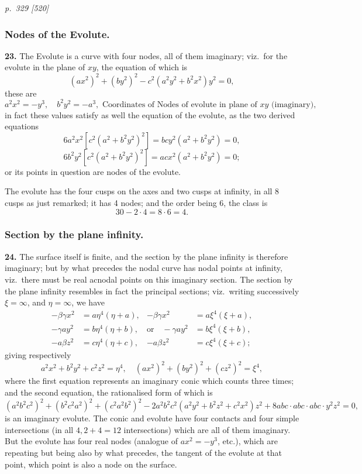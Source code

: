 \documentclass[11pt,a4paper]{article}
\theoremstyle{plain}
\theoremstyle{definition}
\begin{document}
\clearpage

\bigskip
\textit{p.~329 [520]}
\smallskip

\subsubsection*{Nodes of the Evolute.}

\textbf{23.} The Evolute is a curve with four nodes, all of them imaginary; viz.\ for the evolute in the plane of $xy$, the equation of which is
\[
(a x^2)^2 + (b y^2)^2 - c^2(a^2 y^2 + b^2 x^2) y^2 = 0,
\]
these are
\[
a^2 x^2 = -y^3,\quad b^2 y^2 = -a^3,\text{ Coordinates of Nodes of evolute in plane of $xy$ (imaginary)},
\]
in fact these values satisfy as well the equation of the evolute, as the two derived equations
\[
6a^2 x^2 [c^2(a^2 + b^2 y^2)^2] = b c y^2(a^2 + b^2 y^2) = 0,
\]
\[
6b^2 y^2 [c^2(a^2 + b^2 y^2)^2] = a c x^2(a^2 + b^2 y^2) = 0;
\]
or its points in question are nodes of the evolute.

The evolute has the four cusps on the axes and two cusps at infinity, in all 8 cusps as just remarked; it has 4 nodes; and the order being 6, the class is
\[
30 - 2 \cdot 4 = 8 \cdot 6 = 4.
\]

\subsubsection*{Section by the plane infinity.}

\textbf{24.} The surface itself is finite, and the section by the plane infinity is therefore imaginary; but by what precedes the nodal curve has nodal points at infinity, viz.\ there must be real acnodal points on this imaginary section. The section by the plane infinity resembles in fact the principal sections; viz.\ writing successively $\xi = \infty$, and $\eta = \infty$, we have
\begin{align*}
-\beta\gamma x^2 &= a\eta^4(\eta + a), & -\beta\gamma x^2 &= a\xi^4(\xi + a),\\
-\gamma a y^2 &= b\eta^4(\eta + b), & \text{or}\quad -\gamma a y^2 &= b\xi^4(\xi + b),\\
-a\beta z^2 &= c\eta^4(\eta + c), & -a\beta z^2 &= c\xi^4(\xi + c);
\end{align*}
giving respectively
\[
a^2 x^2 + b^2 y^2 + c^2 z^2 = \eta^4,\quad (a x^2)^2 + (b y^2)^2 + (c z^2)^2 = \xi^4,
\]
where the first equation represents an imaginary conic which counts three times; and the second equation, the rationalised form of which is
\[
(a^2 b^2 c^2)^2 + (b^2 c^2 a^2)^2 + (c^2 a^2 b^2)^2 - 2a^2 b^2 c^2 (a^2 y^2 + b^2 z^2 + c^2 x^2) z^2 + 8a b c \cdot a b c \cdot a b c \cdot y^2 z^2 = 0,
\]
is an imaginary evolute. The conic and evolute have four contacts and four simple intersections (in all $4, 2 + 4 = 12$ intersections) which are all of them imaginary. But the evolute has four real nodes (analogue of $a x^2 = -y^3$, etc.), which are repeating but being also by what precedes, the tangent of the evolute at that point, which point is also a node on the surface.
\end{document}
